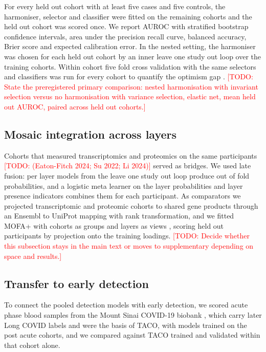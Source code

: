 \documentclass[unnumsec,webpdf,contemporary,large]{oup-authoring-template}
\newcommand{\todo}[1]{\textcolor{red}{[TODO: #1]}}
\begin{document}
For every held out cohort with at least five cases and five controls, the harmoniser, selector and classifier were fitted on the remaining cohorts and the held out cohort was scored once. We report AUROC with stratified bootstrap confidence intervals, area under the precision recall curve, balanced accuracy, Brier score and expected calibration error. In the nested setting, the harmoniser was chosen for each held out cohort by an inner leave one study out loop over the training cohorts. Within cohort five fold cross validation with the same selectors and classifiers was run for every cohort to quantify the optimism gap \citep{bernau2014}. \todo{State the preregistered primary comparison: nested harmonisation with invariant selection versus no harmonisation with variance selection, elastic net, mean held out AUROC, paired across held out cohorts.}

\subsection{Mosaic integration across layers}\label{sec:mosaic}

Cohorts that measured transcriptomics and proteomics on the same participants \todo{(Eaton-Fitch 2024; Su 2022; Li 2024)} served as bridges. We used late fusion: per layer models from the leave one study out loop produce out of fold probabilities, and a logistic meta learner on the layer probabilities and layer presence indicators combines them for each participant. As comparators we projected transcriptomic and proteomic cohorts to shared gene products through an Ensembl to UniProt mapping with rank transformation, and we fitted MOFA+ with cohorts as groups and layers as views \citep{argelaguet2020}, scoring held out participants by projection onto the training loadings. \todo{Decide whether this subsection stays in the main text or moves to supplementary depending on space and results.}

\subsection{Transfer to early detection}

To connect the pooled detection models with early detection, we scored acute phase blood samples from the Mount Sinai COVID-19 biobank \citep{thompson2023}, which carry later Long COVID labels and were the basis of TACO, with models trained on the post acute cohorts, and we compared against TACO trained and validated within that cohort alone.
\end{document}
